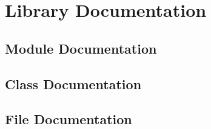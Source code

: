 \documentclass[a4paper,fontsize=10pt,twoside,DIV15,BCOR12mm,headinclude=true,footinclude=false,pagesize,bibtotoc]{scrbook}
\begin{document}
\chapter{Library Documentation}
\label{apx:api}
\section{Module Documentation}




\section{Class Documentation}



\section{File Documentation}







\end{document}
